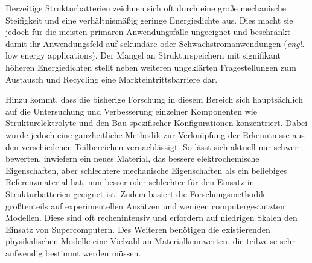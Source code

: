 

Derzeitige Strukturbatterien zeichnen sich oft durch eine große mechanische Steifigkeit und eine verhältnismäßig geringe Energiedichte aus. Dies macht sie jedoch für die meisten primären Anwendungsfälle ungeeignet und beschränkt damit ihr Anwendungsfeld auf sekundäre oder Schwachstromanwendungen (\textit{engl.} low energy applications). Der Mangel an Strukturspeichern mit signifikant höheren Energiedichten stellt neben weiteren ungeklärten Fragestellungen zum Austausch und Recycling eine Markteintrittsbarriere dar.

Hinzu kommt, dass die bisherige Forschung in diesem Bereich sich hauptsächlich auf die Untersuchung und Verbesserung einzelner Komponenten wie Strukturelektrolyte und den Bau spezifischer Konfigurationen konzentriert. Dabei wurde jedoch eine ganzheitliche Methodik zur Verknüpfung der Erkenntnisse aus den verschiedenen Teilbereichen vernachlässigt. So lässt sich aktuell nur schwer bewerten, inwiefern ein neues Material, das bessere elektrochemische Eigenschaften, aber schlechtere mechanische Eigenschaften als ein beliebiges Referenzmaterial hat, nun besser oder schlechter für den Einsatz in Strukturbatterien geeignet ist. Zudem basiert die Forschungsmethodik größtenteils auf experimentellen Ansätzen und wenigen computergestützten Modellen. Diese sind oft rechenintensiv und erfordern auf niedrigen Skalen den Einsatz von Supercomputern. Des Weiteren benötigen die existierenden physikalischen Modelle eine Vielzahl an Materialkennwerten, die teilweise sehr aufwendig bestimmt werden müssen.

